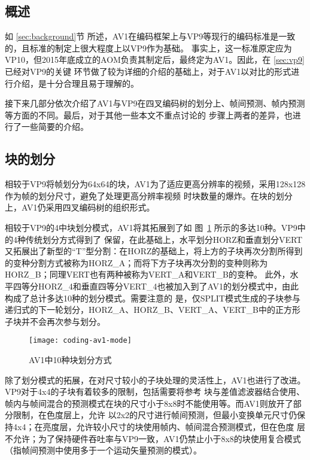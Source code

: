 \subsection{概述}

如 \ref{sec:background}节 所述，AV1在编码框架上与VP9等现行的编码标准是一致的，且标准的制定上很大程度上以VP9作为基础。
事实上，这一标准原定应为VP10，但2015年底成立的AOM负责其制定后，最终定为AV1。因此，在 \ref{sec:vp9} 已经对VP9的关键
环节做了较为详细的介绍的基础上，对于AV1以对比的形式进行介绍，是十分合理且易于理解的。

接下来几部分依次介绍了AV1与VP9在四叉编码树的划分上、帧间预测、帧内预测等方面的不同。最后，对于其他一些本文不重点讨论的
步骤上两者的差异，也进行了一些简要的介绍。

\subsection{块的划分}

相较于VP9将帧划分为64x64的块，AV1为了适应更高分辨率的视频，采用128x128作为帧的划分尺寸，避免了处理更高分辨率视频
时块数量的爆炸。在块的划分上，AV1仍采用四叉编码树的组织形式。

相较于VP9的4中块划分模式，AV1将其拓展到了如 图~\ref{fig:coding-av1-mode} 所示的多达10种。VP9中的4种传统划分方式得到了
保留，在此基础上，水平划分HORZ和垂直划分VERT又拓展出了新型的“T”型分割：在HORZ的基础上，将上方的子块再次分割所得到
的变种分割方式被称为HORZ\_A；而将下方子块再次分割的变种则称为HORZ\_B；同理VERT也有两种被称为VERT\_A和VERT\_B的变种。
此外，水平四等分HORZ\_4和垂直四等分VERT\_4也被加入到了AV1的划分模式中，由此构成了总计多达10种的划分模式。需要注意的
是，仅SPLIT模式生成的子块参与递归式的下一轮划分，HORZ\_A、HORZ\_B、VERT\_A、VERT\_B中的正方形子块并不会再次参与划分。

\begin{figure}[H] %
  \centering
  \texttt{[image: coding-av1-mode]}
  \caption{AV1中10种块划分方式}
  \label{fig:coding-av1-mode}
\end{figure}

除了划分模式的拓展，在对尺寸较小的子块处理的灵活性上，AV1也进行了改进。VP9对于4x4的子块有着较多的限制，包括需要将参考
块与差值滤波器结合使用、帧内与帧间混合的预测模式在块的尺寸小于8x8时不能使用等。而AV1则放开了部分限制，在色度层上，允许
以2x2的尺寸进行帧间预测，但最小变换单元尺寸仍保持4x4；在亮度层，允许较小尺寸的块使用帧内、帧间混合预测模式，但在色度
层不允许；为了保持硬件吞吐率与VP9一致，AV1仍禁止小于8x8的块使用复合模式（指帧间预测中使用多于一个运动矢量预测的模式）。

